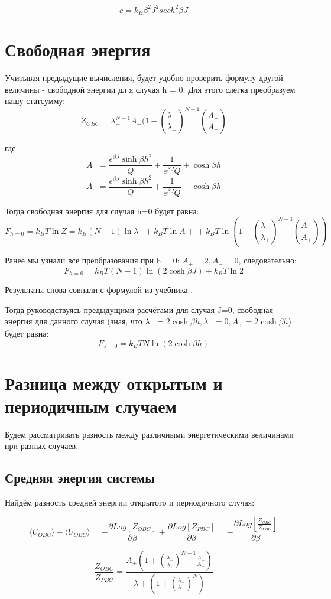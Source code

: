 \documentclass{article}
\newcommand{\bj}{\beta J}
\newcommand{\bh}{\beta h}
\newcommand{\lp}{\lambda_{+}}
\newcommand{\lm}{\lambda_{-}}
\newcommand{\obc}{_{OBC}}
\newcommand{\la}{\langle}
\newcommand{\ra}{\rangle}
\numberwithin{equation}{section}
\begin{document}
\[ c = k_{B} \beta^{2} J^{2} sech^{2} \bj \]

\section{Свободная энергия}
Учитывая предыдущие вычисления, будет удобно проверить формулу другой величины - свободной энергии дл 
я случая h = 0. Для этого слегка преобразуем нашу статсумму:
\[ Z\obc = \lp^{N-1}A_{+}(1 - (\frac{\lm}{\lp})^{N-1}(\frac{A_{-}}{A_{+}}) \]

где \[ A_{+} = \frac{e^{\bj} \sinh{\bh}^2}{Q} + \frac{1}{e^{\bj}Q} +  \cosh{\bh}\]
\[ A_{-} = \frac{e^{\bj} \sinh{\bh}^2}{Q} + \frac{1}{e^{\bj}Q} -  \cosh{\bh}\]

Тогда свободная энергия для случая h=0 будет равна:
\[ F_{h=0} = k_{B}T\ln{Z} =  k_{B}(N-1)\ln{\lp} + k_{B}T\ln{A+} + k_{B}T\ln{(1 - (\frac{\lm}{\lp})^{N-1}(\frac{A_{-}}{A_{+}}))}\]

Ранее мы узнали все преобразования при h = 0: $A_{+} = 2, A_{-} = 0$, следовательно:
\[ F_{h=0} = k_{B}T(N-1)\ln{(2\cosh{\bj})} + k_{B}T\ln{2}\]

Результаты снова совпали с формулой из учебника \cite{Swen}.

Тогда руководствуясь предыдущими расчётами для случая J=0, свободная энергия для данного случая (зная, что $\lp = 2\cosh{\bh}, \lm = 0, A_{+} = 2\cosh{\bh}$) будет равна:
\[ F_{J=0} = k_{B}T N \ln{(2\cosh{\bh})}\]
\section{Разница между открытым и периодичным случаем}

Будем рассматривать разность между различными энергетическими величинами при разных случаев.

\subsection{Средняя энергия системы}


Найдём разность средней энергии открытого и периодичного случая:

\[ \la U_{OBC} \ra - \la U_{OBC} \ra = -\frac{\partial Log[Z_{OBC}]}{\partial \beta} + \frac{\partial Log[Z_{PBC}]}{\partial \beta} = -\frac{\partial Log[\frac{Z_{OBC}}{Z_{PBC}}]}{\partial \beta} \]

\[ \frac{Z_{OBC}}{Z_{PBC}} = \frac{A_{+}\left( 1 + (\frac{\lambda_{-}}{\lambda_{+}})^{N - 1}  \frac{A_{-}}{A_{+}}\right)}{\lambda{+}(1 + (\frac{\lambda_{-}}{\lambda_{+}})^{N})} \]
\end{document}
